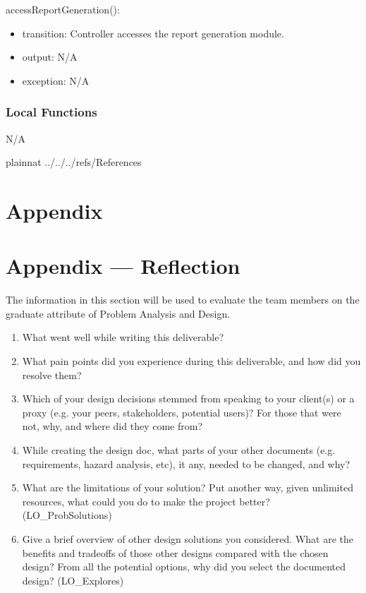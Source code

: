\documentclass[12pt, titlepage]{article}
\begin{document}
\noindent accessReportGeneration():
\begin{itemize}
\item transition: Controller accesses the report generation module.
\item output: N/A
\item exception: N/A
\end{itemize}

\subsubsection{Local Functions}
N/A

\newpage

\newpage

 {plainnat}
 {../../../refs/References}

\newpage

\section{Appendix} \label{Appendix}


\newpage{}

\section*{Appendix --- Reflection}


The information in this section will be used to evaluate the team members on the
graduate attribute of Problem Analysis and Design.



\begin{enumerate}
  \item What went well while writing this deliverable? 
  \item What pain points did you experience during this deliverable, and how
    did you resolve them?
  \item Which of your design decisions stemmed from speaking to your client(s)
  or a proxy (e.g. your peers, stakeholders, potential users)? For those that
  were not, why, and where did they come from?
  \item While creating the design doc, what parts of your other documents (e.g.
  requirements, hazard analysis, etc), it any, needed to be changed, and why?
  \item What are the limitations of your solution?  Put another way, given
  unlimited resources, what could you do to make the project better? (LO\_ProbSolutions)
  \item Give a brief overview of other design solutions you considered.  What
  are the benefits and tradeoffs of those other designs compared with the chosen
  design?  From all the potential options, why did you select the documented design?
  (LO\_Explores)
\end{enumerate}
\end{document}
